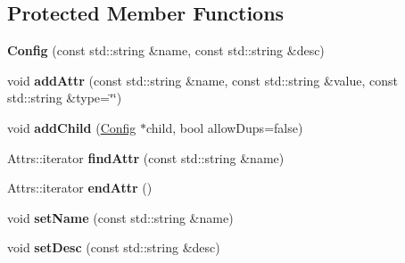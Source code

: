 \subsection*{Protected Member Functions}
\begin{DoxyCompactItemize}
\item 
\mbox{\label{classtheoria_1_1config_1_1Config_a232146edc23baa804dbc82ffd3158f49}} 
{\bfseries Config} (const std\+::string \&name, const std\+::string \&desc)
\item 
\mbox{\label{classtheoria_1_1config_1_1Config_a043dff1e32568ef63eb10c557e6f672d}} 
void {\bfseries add\+Attr} (const std\+::string \&name, const std\+::string \&value, const std\+::string \&type=\char`\"{}\char`\"{})
\item 
\mbox{\label{classtheoria_1_1config_1_1Config_ad96085447d36129bb53057c28bc43e4b}} 
void {\bfseries add\+Child} (\hyperlink{classtheoria_1_1config_1_1Config}{Config} $\ast$child, bool allow\+Dups=false)
\item 
\mbox{\label{classtheoria_1_1config_1_1Config_a5c3e05b3d7119443b0bcb61eb0404829}} 
Attrs\+::iterator {\bfseries find\+Attr} (const std\+::string \&name)
\item 
\mbox{\label{classtheoria_1_1config_1_1Config_adc788e451cd49c6b2c85948bf8f9fb21}} 
Attrs\+::iterator {\bfseries end\+Attr} ()
\item 
\mbox{\label{classtheoria_1_1config_1_1Config_a75b3cca96301a65a4eef01d5c36166c6}} 
void {\bfseries set\+Name} (const std\+::string \&name)
\item 
\mbox{\label{classtheoria_1_1config_1_1Config_adf4e6820b56f6ae52678b493819504ac}} 
void {\bfseries set\+Desc} (const std\+::string \&desc)
\end{DoxyCompactItemize}
